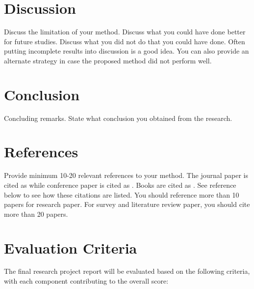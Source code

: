 \documentclass[12pt,portrait]{article}
\begin{document}
\section{Discussion}
Discuss the limitation of your method. Discuss what you could have done better for future studies. Discuss what you did not do that you could have done. Often putting incomplete results into discussion is a good idea. You can also provide   an alternate strategy in case the proposed method did not perform well.


\section{Conclusion}
Concluding remarks. State what conclusion you obtained from the research. 

\section{References}
Provide minimum 10-20 relevant references to your method. The journal paper is cited as \citet{chung.2001.NI} while conference paper is cited as \citet{chung.2003.CVPR}. Books are cited as \citet{chung.2012.CNA}. See reference below to see how these citations are listed. You should reference more than 10 papers for research paper. For survey and literature review paper, you should cite more than 20 papers. 




\newpage 
\section{Evaluation Criteria}

The final research project report will be evaluated based on the following criteria, with each component contributing to the overall score:
\end{document}
